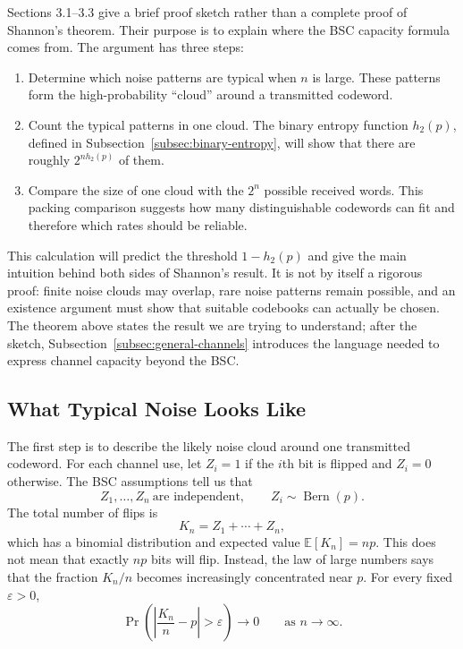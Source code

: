 Sections 3.1--3.3 give a brief proof sketch rather than a complete proof of Shannon's theorem. Their purpose is to explain where the BSC capacity formula comes from. The argument has three steps:
\begin{enumerate}
    \item Determine which noise patterns are typical when $n$ is large. These patterns form the high-probability ``cloud'' around a transmitted codeword.
    \item Count the typical patterns in one cloud. The binary entropy function $h_2(p)$, defined in Subsection~\ref{subsec:binary-entropy}, will show that there are roughly $2^{nh_2(p)}$ of them.
    \item Compare the size of one cloud with the $2^n$ possible received words. This packing comparison suggests how many distinguishable codewords can fit and therefore which rates should be reliable.
\end{enumerate}
This calculation will predict the threshold $1-h_2(p)$ and give the main intuition behind both sides of Shannon's result. It is not by itself a rigorous proof: finite noise clouds may overlap, rare noise patterns remain possible, and an existence argument must show that suitable codebooks can actually be chosen. The theorem above states the result we are trying to understand; after the sketch, Subsection~\ref{subsec:general-channels} introduces the language needed to express channel capacity beyond the BSC.

\subsection{What Typical Noise Looks Like}

The first step is to describe the likely noise cloud around one transmitted codeword. For each channel use, let $Z_i=1$ if the $i$th bit is flipped and $Z_i=0$ otherwise. The BSC assumptions tell us that
\begin{equation}
Z_1,\ldots,Z_n\ \text{are independent},
\qquad
Z_i\sim\operatorname{Bern}(p).
\label{eq:bsc-noise-assumptions}
\end{equation}
The total number of flips is
\begin{equation}
K_n=Z_1+\cdots+Z_n,
\label{eq:total-bsc-flips}
\end{equation}
which has a binomial distribution and expected value $\mathbb{E}[K_n]=np$. This does not mean that exactly $np$ bits will flip. Instead, the law of large numbers says that the fraction $K_n/n$ becomes increasingly concentrated near $p$. For every fixed $\varepsilon>0$,
\begin{equation}
\Pr\left(\left|\frac{K_n}{n}-p\right|>\varepsilon\right)
\longrightarrow0
\qquad\text{as }n\longrightarrow\infty.
\label{eq:noise-concentration}
\end{equation}

